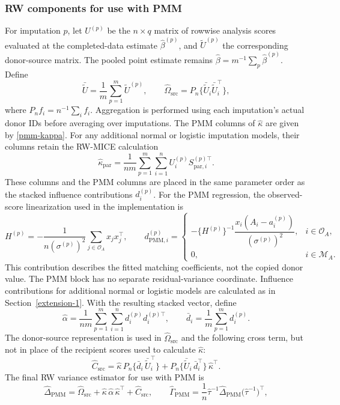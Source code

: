 \subsubsection{RW components for use with PMM}
For imputation \(p\), let \(U^{(p)}\) be the \(n\times q\) matrix of
rowwise analysis scores evaluated at the completed-data estimate
\(\hat\beta^{(p)}\), and \(\widetilde U^{(p)}\) the corresponding
donor-source matrix. The pooled point estimate remains
\(\hat\beta=m^{-1}\sum_p\hat\beta^{(p)}\). Define
\[
\bar{\widetilde U}
=
\frac{1}{m}\sum_{p=1}^m \widetilde U^{(p)},
\qquad
\widehat\Omega_{\mathrm{src}}
=
P_n\{\bar{\widetilde U}_i
\bar{\widetilde U}_i^\top\},
\]
where \(P_n f_i=n^{-1}\sum_i f_i\). Aggregation is performed using each
imputation's actual donor IDs before averaging over imputations.
The PMM columns of \(\widehat\kappa\) are given by
\eqref{pmm-kappa}. For any additional normal or logistic imputation
models, their columns retain the RW-MICE calculation
\[
\widehat\kappa_{\mathrm{par}}
=
\frac{1}{nm}\sum_{p=1}^m\sum_{i=1}^n
U_i^{(p)}S_{\mathrm{par},i}^{(p)\top}.
\]
These columns and the PMM columns are placed in the same parameter order
as the stacked influence contributions \(d_i^{(p)}\).
For the PMM regression, the observed-score linearization used in the
implementation is
\[
H^{(p)}=-\frac{1}{n(\sigma^{(p)})^2}
\sum_{j\in\mathcal O_A}x_jx_j^\top,\qquad
d_{\mathrm{PMM},i}^{(p)}=
\begin{cases}
-\{H^{(p)}\}^{-1}\dfrac{x_i(A_i-a_i^{(p)})}{(\sigma^{(p)})^2},
&i\in\mathcal O_A,\\[4pt]
0,&i\in\mathcal M_A.
\end{cases}
\]
This contribution describes the fitted matching coefficients, not the
copied donor value. The PMM block has no separate residual-variance
coordinate. Influence contributions for additional normal or logistic
models are calculated as in Section~\ref{extension-1}. With the resulting
stacked vector, define
\[
\widehat\alpha=\frac{1}{nm}\sum_{p=1}^m\sum_{i=1}^n
d_i^{(p)}d_i^{(p)\top},\qquad
\bar d_i=\frac{1}{m}\sum_{p=1}^m d_i^{(p)}.
\]
The donor-source representation is used in \(\widehat\Omega_{\mathrm{src}}\)
and the following cross term, but not in place of the recipient scores
used to calculate \(\widehat\kappa\):
\[
\widehat C_{\mathrm{src}}
=
\widehat\kappa\,P_n\bigl\{\bar d_i\,\bar{\widetilde U}_i^\top\bigr\}
+
P_n\bigl\{\bar{\widetilde U}_i\,\bar d_i^\top\bigr\}\,\widehat\kappa^\top .
\]
The final RW variance estimator for use with PMM is
\[
\widehat\Delta_{\mathrm{PMM}}
=
\widehat\Omega_{\mathrm{src}}
+
\widehat\kappa\,\widehat\alpha\,\widehat\kappa^\top
+
\widehat C_{\mathrm{src}},
\qquad
\widehat\Gamma_{\mathrm{PMM}}
=
\frac{1}{n}
\widehat\tau^{-1}
\widehat\Delta_{\mathrm{PMM}}
\bigl(\widehat\tau^{-1}\bigr)^{\!\top},
\]
